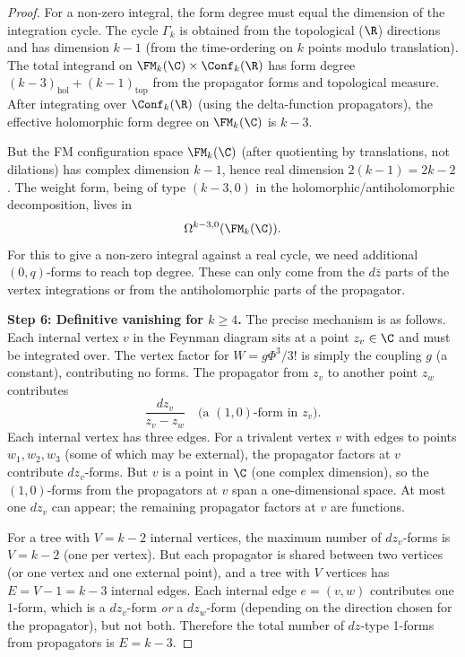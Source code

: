 \begin{proof}
For a non-zero integral, the form degree must equal the dimension of the integration cycle. The cycle $\Gamma_k$ is obtained from the topological ($\R$) directions and has dimension $k-1$ (from the time-ordering on $k$ points modulo translation). The total integrand on $\FM_k(\C) \times \Conf_k(\R)$ has form degree $(k-3)_{\text{hol}} + (k-1)_{\text{top}}$ from the propagator forms and topological measure. After integrating over $\Conf_k(\R)$ (using the delta-function propagators), the effective holomorphic form degree on $\FM_k(\C)$ is $k-3$.

But the FM configuration space $\FM_k(\C)$ (after quotienting by translations, not dilations) has complex dimension $k-1$, hence real dimension $2(k-1) = 2k - 2$. The weight form, being of type $(k-3, 0)$ in the holomorphic/antiholomorphic decomposition, lives in
\[
\Omega^{k-3, 0}(\FM_k(\C)).
\]
For this to give a non-zero integral against a real cycle, we need additional $(0, q)$-forms to reach top degree. These can only come from the $d\bar{z}$ parts of the vertex integrations or from the antiholomorphic parts of the propagator.

\textbf{Step 6: Definitive vanishing for $k \geq 4$.}
The precise mechanism is as follows. Each internal vertex $v$ in the Feynman diagram sits at a point $z_v \in \C$ and must be integrated over. The vertex factor for $W = g\Phi^3/3!$ is simply the coupling $g$ (a constant), contributing no forms. The propagator from $z_v$ to another point $z_w$ contributes
\[
\frac{dz_v}{z_v - z_w} \quad \text{(a $(1,0)$-form in $z_v$)}.
\]
Each internal vertex has three edges. For a trivalent vertex $v$ with edges to points $w_1, w_2, w_3$ (some of which may be external), the propagator factors at $v$ contribute $dz_v$-forms. But $v$ is a point in $\C$ (one complex dimension), so the $(1,0)$-forms from the propagators at $v$ span a one-dimensional space. At most one $dz_v$ can appear; the remaining propagator factors at $v$ are functions.

For a tree with $V = k-2$ internal vertices, the maximum number of $dz_v$-forms is $V = k-2$ (one per vertex). But each propagator is shared between two vertices (or one vertex and one external point), and a tree with $V$ vertices has $E = V - 1 = k - 3$ internal edges. Each internal edge $e = (v, w)$ contributes one $1$-form, which is a $dz_v$-form \emph{or} a $dz_w$-form (depending on the direction chosen for the propagator), but not both. Therefore the total number of $dz$-type 1-forms from propagators is $E = k - 3$.


\end{proof}
